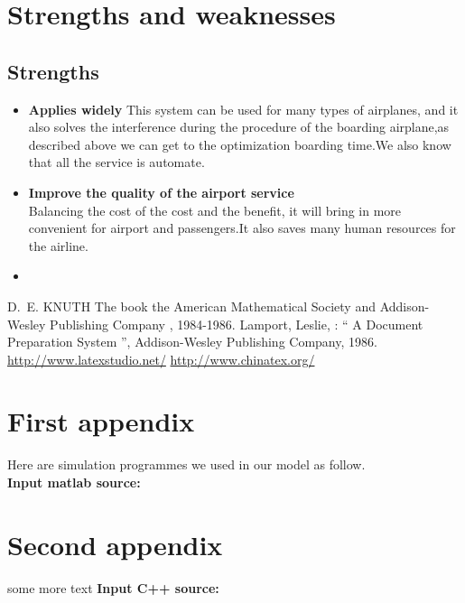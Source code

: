\documentclass{mcmthesis}
\begin{document}
\section{Strengths and weaknesses}
\lipsum[12]

\subsection{Strengths}
\begin{itemize}
\item \textbf{Applies widely}
This  system can be used for many types of airplanes, and it also
solves the interference during  the procedure of the boarding
airplane,as described above we can get to the  optimization
boarding time.We also know that all the service is automate.
\item \textbf{Improve the quality of the airport service}\\
Balancing the cost of the cost and the benefit, it will bring in
more convenient  for airport and passengers.It also saves many
human resources for the airline. \item \textbf{}
\end{itemize}

\begin{thebibliography}{99}%
 D.~E. KNUTH   The book  the American
Mathematical Society and Addison-Wesley
Publishing Company , 1984-1986.
Lamport, Leslie,  : `` A Document Preparation System '',
Addison-Wesley Publishing Company, 1986.
\url{http://www.latexstudio.net/}
\url{http://www.chinatex.org/}
\end{thebibliography}

\begin{appendices}

\section{First appendix}

\lipsum[13]

Here are simulation programmes we used in our model as follow.\\

\textbf{\textcolor[rgb]{0.98,0.00,0.00}{Input matlab source:}}


\section{Second appendix}

some more text \textcolor[rgb]{0.98,0.00,0.00}{\textbf{Input C++ source:}}


\end{appendices}
\end{document}
